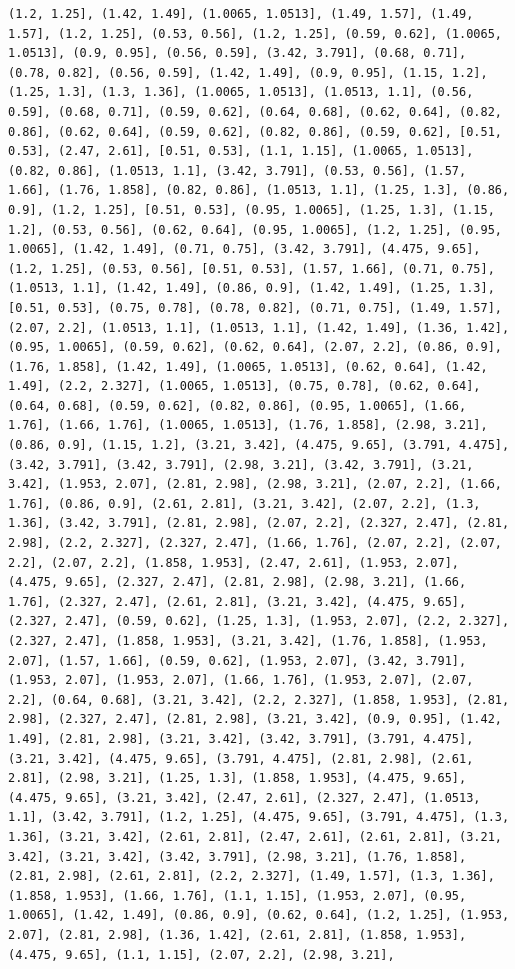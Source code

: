 \documentclass[12pt,fleqn]{article}\usepackage{../common}
\begin{document}
\begin{verbatim}
(1.2, 1.25], (1.42, 1.49], (1.0065, 1.0513], (1.49, 1.57], (1.49, 1.57], (1.2, 1.25], (0.53, 0.56], (1.2, 1.25], (0.59, 0.62], (1.0065, 1.0513], (0.9, 0.95], (0.56, 0.59], (3.42, 3.791], (0.68, 0.71], (0.78, 0.82], (0.56, 0.59], (1.42, 1.49], (0.9, 0.95], (1.15, 1.2], (1.25, 1.3], (1.3, 1.36], (1.0065, 1.0513], (1.0513, 1.1], (0.56, 0.59], (0.68, 0.71], (0.59, 0.62], (0.64, 0.68], (0.62, 0.64], (0.82, 0.86], (0.62, 0.64], (0.59, 0.62], (0.82, 0.86], (0.59, 0.62], [0.51, 0.53], (2.47, 2.61], [0.51, 0.53], (1.1, 1.15], (1.0065, 1.0513], (0.82, 0.86], (1.0513, 1.1], (3.42, 3.791], (0.53, 0.56], (1.57, 1.66], (1.76, 1.858], (0.82, 0.86], (1.0513, 1.1], (1.25, 1.3], (0.86, 0.9], (1.2, 1.25], [0.51, 0.53], (0.95, 1.0065], (1.25, 1.3], (1.15, 1.2], (0.53, 0.56], (0.62, 0.64], (0.95, 1.0065], (1.2, 1.25], (0.95, 1.0065], (1.42, 1.49], (0.71, 0.75], (3.42, 3.791], (4.475, 9.65], (1.2, 1.25], (0.53, 0.56], [0.51, 0.53], (1.57, 1.66], (0.71, 0.75], (1.0513, 1.1], (1.42, 1.49], (0.86, 0.9], (1.42, 1.49], (1.25, 1.3], [0.51, 0.53], (0.75, 0.78], (0.78, 0.82], (0.71, 0.75], (1.49, 1.57], (2.07, 2.2], (1.0513, 1.1], (1.0513, 1.1], (1.42, 1.49], (1.36, 1.42], (0.95, 1.0065], (0.59, 0.62], (0.62, 0.64], (2.07, 2.2], (0.86, 0.9], (1.76, 1.858], (1.42, 1.49], (1.0065, 1.0513], (0.62, 0.64], (1.42, 1.49], (2.2, 2.327], (1.0065, 1.0513], (0.75, 0.78], (0.62, 0.64], (0.64, 0.68], (0.59, 0.62], (0.82, 0.86], (0.95, 1.0065], (1.66, 1.76], (1.66, 1.76], (1.0065, 1.0513], (1.76, 1.858], (2.98, 3.21], (0.86, 0.9], (1.15, 1.2], (3.21, 3.42], (4.475, 9.65], (3.791, 4.475], (3.42, 3.791], (3.42, 3.791], (2.98, 3.21], (3.42, 3.791], (3.21, 3.42], (1.953, 2.07], (2.81, 2.98], (2.98, 3.21], (2.07, 2.2], (1.66, 1.76], (0.86, 0.9], (2.61, 2.81], (3.21, 3.42], (2.07, 2.2], (1.3, 1.36], (3.42, 3.791], (2.81, 2.98], (2.07, 2.2], (2.327, 2.47], (2.81, 2.98], (2.2, 2.327], (2.327, 2.47], (1.66, 1.76], (2.07, 2.2], (2.07, 2.2], (2.07, 2.2], (1.858, 1.953], (2.47, 2.61], (1.953, 2.07], (4.475, 9.65], (2.327, 2.47], (2.81, 2.98], (2.98, 3.21], (1.66, 1.76], (2.327, 2.47], (2.61, 2.81], (3.21, 3.42], (4.475, 9.65], (2.327, 2.47], (0.59, 0.62], (1.25, 1.3], (1.953, 2.07], (2.2, 2.327], (2.327, 2.47], (1.858, 1.953], (3.21, 3.42], (1.76, 1.858], (1.953, 2.07], (1.57, 1.66], (0.59, 0.62], (1.953, 2.07], (3.42, 3.791], (1.953, 2.07], (1.953, 2.07], (1.66, 1.76], (1.953, 2.07], (2.07, 2.2], (0.64, 0.68], (3.21, 3.42], (2.2, 2.327], (1.858, 1.953], (2.81, 2.98], (2.327, 2.47], (2.81, 2.98], (3.21, 3.42], (0.9, 0.95], (1.42, 1.49], (2.81, 2.98], (3.21, 3.42], (3.42, 3.791], (3.791, 4.475], (3.21, 3.42], (4.475, 9.65], (3.791, 4.475], (2.81, 2.98], (2.61, 2.81], (2.98, 3.21], (1.25, 1.3], (1.858, 1.953], (4.475, 9.65], (4.475, 9.65], (3.21, 3.42], (2.47, 2.61], (2.327, 2.47], (1.0513, 1.1], (3.42, 3.791], (1.2, 1.25], (4.475, 9.65], (3.791, 4.475], (1.3, 1.36], (3.21, 3.42], (2.61, 2.81], (2.47, 2.61], (2.61, 2.81], (3.21, 3.42], (3.21, 3.42], (3.42, 3.791], (2.98, 3.21], (1.76, 1.858], (2.81, 2.98], (2.61, 2.81], (2.2, 2.327], (1.49, 1.57], (1.3, 1.36], (1.858, 1.953], (1.66, 1.76], (1.1, 1.15], (1.953, 2.07], (0.95, 1.0065], (1.42, 1.49], (0.86, 0.9], (0.62, 0.64], (1.2, 1.25], (1.953, 2.07], (2.81, 2.98], (1.36, 1.42], (2.61, 2.81], (1.858, 1.953], (4.475, 9.65], (1.1, 1.15], (2.07, 2.2], (2.98, 3.21], 
\end{verbatim}
\end{document}
